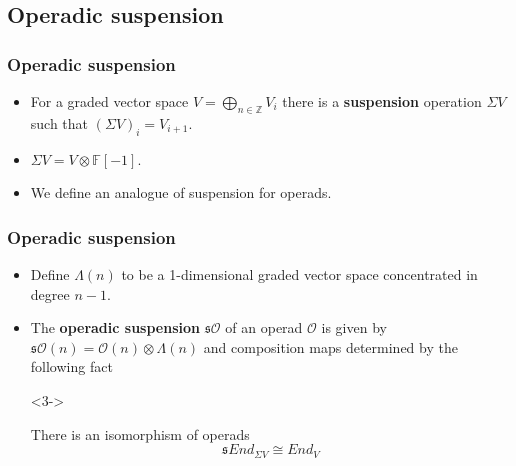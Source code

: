 \documentclass{beamer}
\theoremstyle{definition}
\newcommand{\Z}{\mathbb{Z}}
\begin{document}
\subsection{Operadic suspension}
\begin{frame}
\frametitle{Operadic suspension}
\begin{itemize}
\item<1-> For a graded vector space $V=\bigoplus_{n\in\Z} V_i$ there is a \textbf{suspension} operation $\Sigma V$ such that $(\Sigma V)_i=V_{i+1}$. \item<2-> $\Sigma V=V\otimes \mathbb{F}[-1]$.
\item<3-> We define an analogue of suspension for operads.
\end{itemize}
\end{frame}

\begin{frame}
\frametitle{Operadic suspension}
\begin{itemize}
\item<1-> Define $\Lambda(n)$ to be a 1-dimensional graded vector space concentrated in degree $n-1$.
\item<2-> The \textbf{operadic suspension} $\mathfrak{s}\mathcal{O}$ of an operad $\mathcal{O}$ is given by $\mathfrak{s}\mathcal{O}(n)=\mathcal{O}(n)\otimes \Lambda(n)$ and composition maps determined by the following fact
\item[]<3->
\begin{theorem}[Markl]
There is an isomorphism of operads
\[ \mathfrak{s}End_{\Sigma V}\cong End_V\]
\end{theorem}
\end{itemize}
\end{frame}
\end{document}
